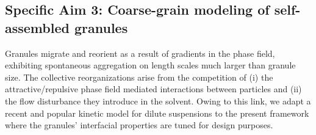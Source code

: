 \subsection{Specific Aim 3: Coarse-grain modeling of self-assembled granules}
\label{sec:specificaim3}

Granules migrate and reorient as a result of gradients in the phase
field, exhibiting spontaneous aggregation on length scales much larger
than granule size. The collective reorganizations arise from the
competition of (i) the attractive/repulsive phase field mediated
interactions between particles and (ii) the flow disturbance they
introduce in the solvent. Owing to this link, we adapt a recent and
popular kinetic model for dilute suspensions to the present framework
where the granules' interfacial properties are tuned for design
purposes.

